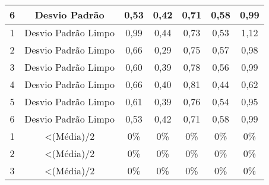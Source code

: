 \begin{table}[]
\begin{tabular}{|c|c|ccccc|}
6                         & Desvio Padrão                                                              & 0,53                       & 0,42                       & 0,71                      & 0,58                      & 0,99                       \\ \hline
1                         & Desvio Padrão Limpo                                                        & 0,99                       & 0,44                       & 0,73                      & 0,53                      & 1,12                       \\
2                         & Desvio Padrão Limpo                                                        & 0,66                       & 0,29                       & 0,75                      & 0,57                      & 0,98                       \\
3                         & Desvio Padrão Limpo                                                        & 0,60                       & 0,39                       & 0,78                      & 0,56                      & 0,99                       \\
4                         & Desvio Padrão Limpo                                                        & 0,66                       & 0,40                       & 0,81                      & 0,44                      & 0,62                       \\
5                         & Desvio Padrão Limpo                                                        & 0,61                       & 0,39                       & 0,76                      & 0,54                      & 0,95                       \\
6                         & Desvio Padrão Limpo                                                        & 0,53                       & 0,42                       & 0,71                      & 0,58                      & 0,99                       \\ \hline
1                         & \textless (Média)/2                                                        & 0\%                     & 0\%                     & 0\%                    & 0\%                    & 0\%                     \\
2                         & \textless (Média)/2                                                        & 0\%                     & 0\%                     & 0\%                    & 0\%                    & 0\%                     \\
3                         & \textless (Média)/2                                                        & 0\%                     & 0\%                     & 0\%                    & 0\%                    & 0\%                     \\

\end{tabular}
\end{table}

